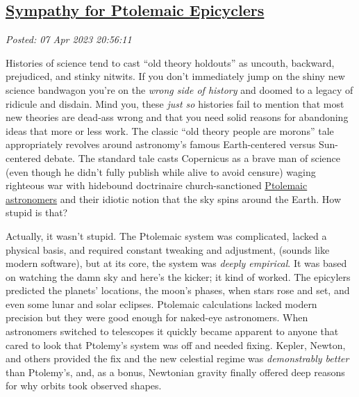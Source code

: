 %

\subsection*{\href{http://analyzethedatanotthedrivel.org/2023/04/07/sympathy-for-ptolemaic-epicyclers/}{Sympathy for Ptolemaic Epicyclers}}


\noindent\emph{Posted: 07 Apr 2023 20:56:11}
\vspace{6pt}

Histories of science tend to cast ``old theory holdouts'' as uncouth,
backward, prejudiced, and stinky nitwits. If you don't immediately jump
on the shiny new science bandwagon you're on the \emph{wrong side of
history} and doomed to a legacy of ridicule and disdain. Mind you, these
\emph{just so} histories fail to mention that most new theories are
dead-ass wrong and that you need solid reasons for abandoning ideas that
more or less work. The classic ``old theory people are morons'' tale
appropriately revolves around astronomy's famous Earth-centered versus
Sun-centered debate. The standard tale casts Copernicus as a brave man
of science (even though he didn't fully publish while alive to avoid
censure) waging righteous war with hidebound doctrinaire
church-sanctioned
\href{https://microcosmos.uchicago.edu/ptolemy/astronomy.html}{Ptolemaic
astronomers} and their idiotic notion that the sky spins around the
Earth. How stupid is that?

Actually, it wasn't stupid. The Ptolemaic system was complicated, lacked
a physical basis, and required constant tweaking and adjustment, (sounds
like modern software), but at its core, the system was \emph{deeply
empirical}. It was based on watching the damn sky and here's the kicker;
it kind of worked. The epicylers predicted the planets' locations, the
moon's phases, when stars rose and set, and even some lunar and solar
eclipses. Ptolemaic calculations lacked modern precision but they were
good enough for naked-eye astronomers. When astronomers switched to
telescopes it quickly became apparent to anyone that cared to look that
Ptolemy's system was off and needed fixing. Kepler, Newton, and others
provided the fix and the new celestial regime was \emph{demonstrably
better} than Ptolemy's, and, as a bonus, Newtonian gravity finally
offered deep reasons for why orbits took observed shapes.

